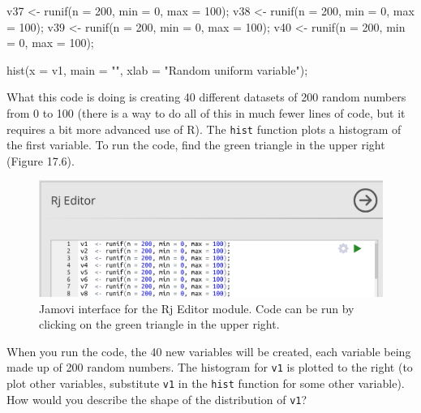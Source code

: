 \documentclass[
  openany]{scrbook}
\newenvironment{Shaded}{\begin{snugshade}}{\end{snugshade}}
\newcommand{\AttributeTok}[1]{\textcolor[rgb]{0.77,0.63,0.00}{#1}}
\newcommand{\DecValTok}[1]{\textcolor[rgb]{0.00,0.00,0.81}{#1}}
\newcommand{\FunctionTok}[1]{\textcolor[rgb]{0.00,0.00,0.00}{#1}}
\newcommand{\NormalTok}[1]{#1}
\newcommand{\OtherTok}[1]{\textcolor[rgb]{0.56,0.35,0.01}{#1}}
\newcommand{\StringTok}[1]{\textcolor[rgb]{0.31,0.60,0.02}{#1}}
\begin{document}
\begin{Shaded}
\begin{Highlighting}[]
\NormalTok{v37 }\OtherTok{\textless{}{-}} \FunctionTok{runif}\NormalTok{(}\AttributeTok{n =} \DecValTok{200}\NormalTok{, }\AttributeTok{min =} \DecValTok{0}\NormalTok{, }\AttributeTok{max =} \DecValTok{100}\NormalTok{);}
\NormalTok{v38 }\OtherTok{\textless{}{-}} \FunctionTok{runif}\NormalTok{(}\AttributeTok{n =} \DecValTok{200}\NormalTok{, }\AttributeTok{min =} \DecValTok{0}\NormalTok{, }\AttributeTok{max =} \DecValTok{100}\NormalTok{);}
\NormalTok{v39 }\OtherTok{\textless{}{-}} \FunctionTok{runif}\NormalTok{(}\AttributeTok{n =} \DecValTok{200}\NormalTok{, }\AttributeTok{min =} \DecValTok{0}\NormalTok{, }\AttributeTok{max =} \DecValTok{100}\NormalTok{);}
\NormalTok{v40 }\OtherTok{\textless{}{-}} \FunctionTok{runif}\NormalTok{(}\AttributeTok{n =} \DecValTok{200}\NormalTok{, }\AttributeTok{min =} \DecValTok{0}\NormalTok{, }\AttributeTok{max =} \DecValTok{100}\NormalTok{);}

\FunctionTok{hist}\NormalTok{(}\AttributeTok{x =}\NormalTok{ v1, }\AttributeTok{main =} \StringTok{""}\NormalTok{, }\AttributeTok{xlab =} \StringTok{"Random uniform variable"}\NormalTok{);}
\end{Highlighting}
\end{Shaded}

What this code is doing is creating 40 different datasets of 200 random numbers from 0 to 100 (there is a way to do all of this in much fewer lines of code, but it requires a bit more advanced use of R).
The \texttt{hist} function plots a histogram of the first variable.
To run the code, find the green triangle in the upper right (Figure 17.6).

\begin{figure}
\includegraphics[width=0.8\linewidth]{img/jamovi_RjEditor} \caption{Jamovi interface for the Rj Editor module. Code can be run by clicking on the green triangle in the upper right.}\label{fig:unnamed-chunk-71}
\end{figure}

When you run the code, the 40 new variables will be created, each variable being made up of 200 random numbers.
The histogram for \texttt{v1} is plotted to the right (to plot other variables, substitute \texttt{v1} in the \texttt{hist} function for some other variable).
How would you describe the shape of the distribution of \texttt{v1}?
\end{document}

